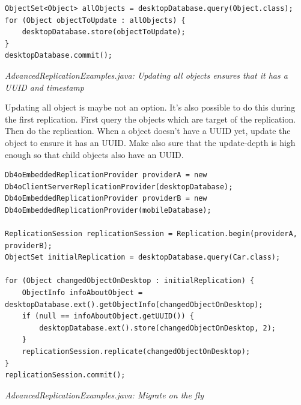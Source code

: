 \begin{lstlisting}
ObjectSet<Object> allObjects = desktopDatabase.query(Object.class);
for (Object objectToUpdate : allObjects) {
    desktopDatabase.store(objectToUpdate);
}
desktopDatabase.commit();
\end{lstlisting}

{\small\itshape AdvancedReplicationExamples.java: Updating all objects ensures that it has a UUID and timestamp\par}
\medskip

Updating all object is maybe not an option. It's also possible to do this during the first replication. First query the objects which are target of the replication. Then do the replication. When a object doesn't have a UUID yet, update the object to ensure it has an UUID. Make also sure that the update-depth is high enough so that child objects also have an UUID.

\begin{lstlisting}
Db4oEmbeddedReplicationProvider providerA = new Db4oClientServerReplicationProvider(desktopDatabase);
Db4oEmbeddedReplicationProvider providerB = new Db4oEmbeddedReplicationProvider(mobileDatabase);

ReplicationSession replicationSession = Replication.begin(providerA, providerB);
ObjectSet initialReplication = desktopDatabase.query(Car.class);

for (Object changedObjectOnDesktop : initialReplication) {
    ObjectInfo infoAboutObject = desktopDatabase.ext().getObjectInfo(changedObjectOnDesktop);
    if (null == infoAboutObject.getUUID()) {
        desktopDatabase.ext().store(changedObjectOnDesktop, 2);
    }
    replicationSession.replicate(changedObjectOnDesktop);
}
replicationSession.commit();
\end{lstlisting}

{\small\itshape AdvancedReplicationExamples.java: Migrate on the fly\par}
\medskip

